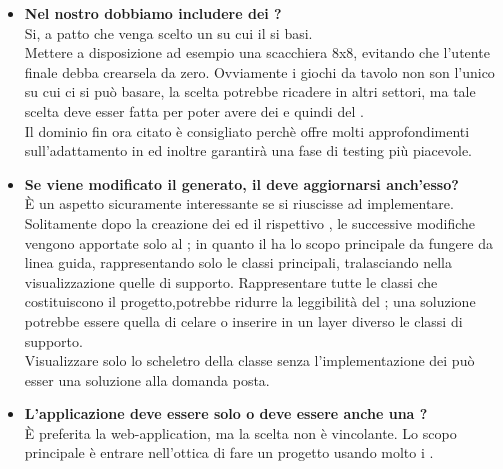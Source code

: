 \begin{itemize}
\newpage			  	
	      \item
	      \textbf{Nel nostro  dobbiamo includere dei ?\\}
		\justifying
		Si, a patto che venga scelto un  su cui il  si basi.\\
		Mettere a disposizione ad esempio una scacchiera 8x8, evitando che l'utente finale debba crearsela da zero.
		Ovviamente i giochi da tavolo non son l'unico  su cui ci si può basare, la scelta potrebbe ricadere in altri settori, ma tale scelta deve esser fatta per poter avere dei  e quindi del .\\
	Il dominio fin ora citato è consigliato perchè offre molti approfondimenti sull'adattamento in  ed inoltre garantirà una fase di testing più piacevole. \\
	
	    \item
	    \textbf{Se viene modificato il  generato, il  deve aggiornarsi anch'esso?\\}
	    \justifying
	   È un aspetto sicuramente interessante se si riuscisse ad implementare. Solitamente dopo la creazione dei  ed il rispettivo , le successive modifiche vengono apportate solo al ; in quanto il  ha lo scopo principale da fungere da linea guida, rappresentando solo le classi principali, tralasciando nella visualizzazione quelle di supporto. Rappresentare tutte le classi che costituiscono il progetto,potrebbe ridurre la leggibilità del ; una soluzione potrebbe essere quella di celare o inserire in un layer diverso le classi di supporto.\\
     Visualizzare solo lo scheletro della classe senza l'implementazione dei  può esser una soluzione alla domanda posta.\\
	     
	   	 \item
	   	 \textbf{L'applicazione deve essere solo  o deve essere anche una ?\\}
	   	 \justifying
	   	 È preferita la web-application, ma la scelta non è vincolante. Lo scopo principale è entrare nell'ottica di fare un progetto usando molto i .\\
			 	

\end{itemize}
